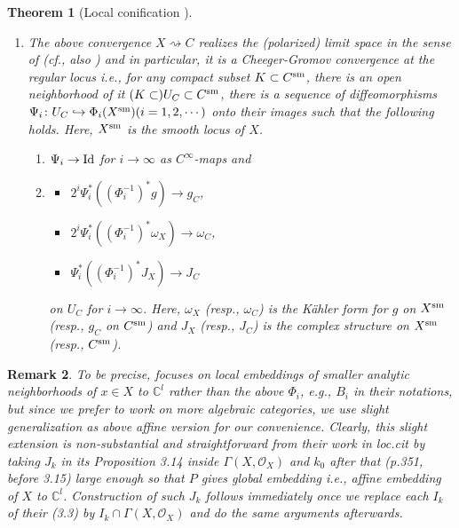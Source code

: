 \documentclass[12pt,a4paper]{amsart}
\newtheorem{Thm}{Theorem}[section]
\newtheorem{Rem}[Thm]{Remark}
\theoremstyle{remark}
\theoremstyle{definition}
\def\C{\mathbb{C}}
\begin{document}
\begin{Thm}[Local conification \cite{DSII}]
\begin{enumerate}
    We set $X_i:=\Phi_i(X)$ and $W_i:=\lim_{j\to \infty}\Lambda^j X_i
=(E_i\circ E_{i-1}\circ \cdots E_1)(W)$ for $i,j=1,2,\cdots$. 
In \S \ref{sec:WC}, we analyze $\Lambda^j (X_i)$ for a priori different 
$i$ and $j$s, which justifies the usefulness of two subindices as 
later convenience. 

    \item \label{DSiii} The above convergence $X\rightsquigarrow C$ realizes the 
    (polarized) limit space in the sense of \cite[p.330]{DSII} (cf., also \cite{DS}) 
    and 
    in particular, it is a Cheeger-Gromov convergence at the regular locus i.e., for any 
    compact subset $K\subset C^{\rm sm}$, 
    there is an open neighborhood of it $(K\subset) U_C\subset C^{\rm sm}$, there is a sequence of diffeomorphisms  $\Psi_i\colon U_C \hookrightarrow  \Phi_i(X^{\rm sm}) (i=1,2,\cdots)$ onto their images 
     such that the following holds. Here, $X^{\rm sm}$ is the smooth locus of $X$. 
    \begin{enumerate}
    \item \label{DSiiia} 
    $\Psi_i\to {\rm Id}$ for $i\to \infty$ as $C^\infty$-maps and 
    \item \label{DSiiib} 
    \begin{itemize}
    \item $2^i \Psi_i^*((\Phi_i^{-1})^* g)\to g_C$, 
    \item $2^i \Psi_i^*((\Phi_i^{-1})^*\omega_X)\to \omega_C$, 
    \item $\Psi_i^*((\Phi_i^{-1})^*J_X)\to J_C $ 
    \end{itemize}
    on 
    $U_C$ for $i\to \infty$. Here, $\omega_X$ (resp., $\omega_C$)  
    is the K\"ahler form for $g$ on $X^{\rm sm}$ (resp., $g_C$ on 
    $C^{\rm sm}$) and $J_X$ (resp., $J_C$) is the complex structure on $X^{\rm sm}$ (resp., $C^{\rm sm}$). 
    \end{enumerate}
\end{enumerate}
\end{Thm}

\begin{Rem}\label{balltoaffine}
To be precise, \cite{DSII} focuses on local embeddings of smaller 
analytic neighborhoods of $x\in X$ to $\C^l$ rather than the above $\Phi_i$, 
e.g., $B_i$ in their notations, 
but since we prefer to 
work on more algebraic categories, we use slight generalization 
as above affine version for our convenience. 
Clearly, this slight extension is non-substantial and 
straightforward from their work in {\it loc.cit} 
by taking $J_k$ in its Proposition 3.14 inside $\Gamma(X,\mathcal{O}_X)$ 
and $k_0$ after that (p.351, before 3.15) large enough 
so that $P$ gives global embedding i.e., affine embedding of 
$X$ to $\C^l$. 
Construction of such $J_k$ follows immediately once we replace each $I_k$ 
of their (3.3) by $I_k\cap \Gamma(X,\mathcal{O}_X)$ and do the same arguments afterwards. 
\end{Rem}
\end{document}
